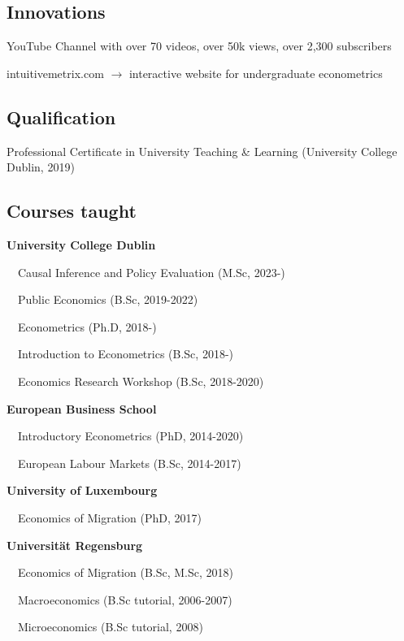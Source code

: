 \documentclass[10pt,a4paper,]{article}
\begin{document}
\hypertarget{innovations}{%
\subsection{Innovations}\label{innovations}}

YouTube Channel with over 70 videos, over 50k views, over 2,300
subscribers

intuitivemetrix.com \(\rightarrow\) interactive website for
undergraduate econometrics

\hypertarget{qualification}{%
\subsection{Qualification}\label{qualification}}

Professional Certificate in University Teaching \& Learning (University
College Dublin, 2019)

\hypertarget{courses-taught}{%
\subsection{Courses taught}\label{courses-taught}}

\textbf{University College Dublin}

~~Causal Inference and Policy Evaluation (M.Sc, 2023-)

~~Public Economics (B.Sc, 2019-2022)

~~Econometrics (Ph.D, 2018-)

~~Introduction to Econometrics (B.Sc, 2018-)

~~Economics Research Workshop (B.Sc, 2018-2020)

\medskip

\textbf{European Business School}

~~Introductory Econometrics (PhD, 2014-2020)

~~European Labour Markets (B.Sc, 2014-2017)

\medskip

\textbf{University of Luxembourg}

~~Economics of Migration (PhD, 2017)

\medskip

\textbf{Universität Regensburg}

~~Economics of Migration (B.Sc, M.Sc, 2018)

~~Macroeconomics (B.Sc tutorial, 2006-2007)

~~Microeconomics (B.Sc tutorial, 2008)

\medskip
\end{document}
